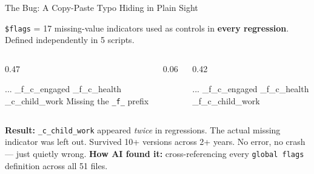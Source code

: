 \documentclass[aspectratio=169, 10pt]{beamer}
\begin{document}
\begin{frame}[fragile]{The Bug: A Copy-Paste Typo Hiding in Plain Sight}
\vskip-2pt
\begin{tcolorbox}[keybox, title={\faBug\quad The \texttt{\$flags} variable list}, top=2pt, bottom=2pt]
\small
\texttt{\$flags} = 17 missing-value indicators used as controls in \textbf{every regression}. Defined independently in 5 scripts.
\end{tcolorbox}
\vskip3pt
\begin{columns}[T]
\begin{column}{0.47\textwidth}
\begin{tcolorbox}[colback=SoftCoral!8, colframe=SoftCoral, boxrule=0.5pt, arc=2pt, left=5pt, right=5pt, top=3pt, bottom=3pt]
\vskip3pt
{\ttfamily\small\color{DeepCharcoal}
... \_f\_c\_engaged \_f\_c\_health\\
\colorbox{SoftCoral!20}{\_c\_child\_work}}
\vskip2pt
{\scriptsize Missing the \texttt{\_f\_} prefix}
\end{tcolorbox}
\end{column}
\begin{column}{0.06\textwidth}
\centering\vskip0.8cm
{\large\color{UVMGold}\faArrowRight}
\end{column}
\begin{column}{0.42\textwidth}
\begin{tcolorbox}[colback=PaleSage, colframe=SlateTeal!50, boxrule=0.5pt, arc=2pt, left=5pt, right=5pt, top=3pt, bottom=3pt]
\vskip3pt
{\ttfamily\small\color{DeepCharcoal}
... \_f\_c\_engaged \_f\_c\_health\\
\colorbox{PaleSage!50}{\_f\_c\_child\_work}}
\end{tcolorbox}
\end{column}
\end{columns}
\vskip3pt
\begin{tcolorbox}[quotebox, top=2pt, bottom=2pt]
\scriptsize \textbf{Result:} \texttt{\_c\_child\_work} appeared \textit{twice} in regressions. The actual missing indicator was left out. Survived 10+ versions across 2+ years. No error, no crash --- just quietly wrong.
\textbf{How AI found it:} cross-referencing every \texttt{global flags} definition across all 51 files.
\end{tcolorbox}
\end{frame}
\end{document}
